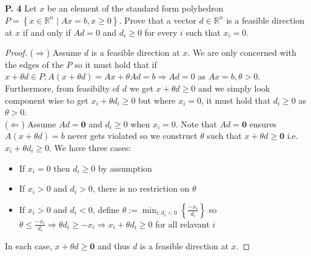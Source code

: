 \documentclass{article}
\begin{document}
\begin{jacklist}
\newpage
    \begin{framed} 
    \item [\textbf{P. 4}] Let $x$ be an element of the standard form polyhedron 
        $P=\left\{x \in \mathbb{R}^{n} \mid A x=b, x \geq 0\right\}$. Prove that a vector $d \in \mathbb{R}^{n}$ is a feasible 
        direction at $x$ if and only if $A d=0$ and $d_{i} \geq 0$ for every $i$ such that $x_{i}=0$.
    \end{framed}
    \begin{proof}
        ($\Rightarrow$) Assume $d$ is a feasible direction at $x$. We are only concerned with the edges of the $P$ so it must hold that if 
        $x + \theta d \in P; A(x+\theta d) = Ax + \theta Ad = b \Rightarrow Ad = 0$ as $Ax = b, \theta > 0$. Furthermore, 
        from feasibilty of $d$ we get $x + \theta d \geq 0$ and we simply look component wise to get $x_i + \theta d_i \geq 0$ but where
        $x_i = 0$, it must hold that $d_i \geq 0$ as $\theta > 0$. \\
        ($\Leftarrow$) Assume $Ad = \textbf{0}$ and $d_i \geq 0$ when $x_i = 0$. Note that $Ad = \textbf{0}$ 
        ensures $A(x + \theta d) = b$ never gets violated so we construct $\theta$ such that 
        $x + \theta d \geq \textbf{0}$ i.e. $x_i + \theta d_i \geq 0$. We have three cases:
        \begin{itemize}
            \item If $x_i = 0$ then $d_i \geq 0$ by assumption 
            \item If $x_i > 0$ and $d_i > 0$, there is no restriction on $\theta$ 
            \item If $x_i > 0$ and $d_i < 0$, define $ \displaystyle \theta := \min_{i:d_i<0}\left\{ \frac{-x_i}{d_i}\right\}$ so
                $ \displaystyle \theta \leq \frac{-x_i}{d_i} \Rightarrow \theta d_i \geq -x_i \Rightarrow x_i + \theta d_i \geq 0$ 
                for all relavant $i$
        \end{itemize}
        In each case, $x + \theta d \geq \textbf{0}$ and thus $d$ is a feasible direction at $x$. 
    \end{proof}


\end{jacklist}
\end{document}
